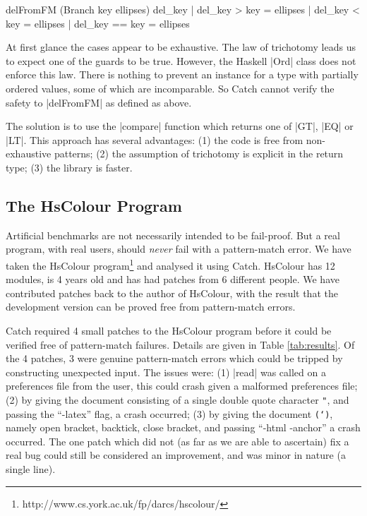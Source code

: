 \documentclass[preprint]{sigplanconf}
\begin{document}
\begin{code}
delFromFM (Branch key ellipses) del_key  | del_key  >   key = ellipses
                                         | del_key  <   key = ellipses
                                         | del_key  ==  key = ellipses
\end{code}

At first glance the cases appear to be exhaustive. The law of trichotomy leads us to expect one of the guards to be true. However, the Haskell |Ord| class does not enforce this law. There is nothing to prevent an instance for a type with partially ordered values, some of which are incomparable. So Catch cannot verify the safety to |delFromFM| as defined as above.

The solution is to use the |compare| function which returns one of |GT|, |EQ| or |LT|. This approach has several advantages: (1) the code is free from non-exhaustive patterns; (2) the assumption of trichotomy is explicit in the return type; (3) the library is faster.


\subsection{The HsColour Program}
\label{sec:hscolour}

Artificial benchmarks are not necessarily intended to be fail-proof. But a real program, with real users, should \textit{never} fail with a pattern-match error. We have taken the HsColour program\footnote{http://www.cs.york.ac.uk/fp/darcs/hscolour/} and analysed it using Catch. HsColour has 12 modules, is 4 years old and has had patches from 6 different people.
We have contributed patches back to the author of HsColour, with the result that the development version can be proved free from pattern-match errors.

Catch required 4 small patches to the HsColour program before it could be verified free of pattern-match failures. Details are given in Table \ref{tab:results}. Of the 4 patches, 3 were genuine pattern-match errors which could be tripped by constructing unexpected input. The issues were: (1) |read| was called on a preferences file from the user, this could crash given a malformed preferences file; (2) by giving the document consisting of a single double quote character \texttt{"}, and passing the ``-latex'' flag, a crash occurred; (3) by giving the document \texttt{(`)}, namely open bracket, backtick, close bracket, and passing ``-html -anchor'' a crash occurred. The one patch which did not (as far as we are able to ascertain) fix a real bug could still be considered an improvement, and was minor in nature (a single line).
\end{document}
